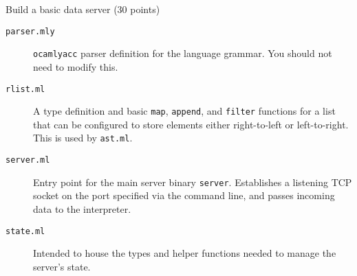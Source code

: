 \documentclass[11pt]{article}
\begin{document}
\begin{problem}{Build a basic data server (30 points)}
\begin{description}
\item[\texttt{parser.mly}] \texttt{ocamlyacc} parser definition for the language grammar. You should not need to modify this.

\item[\texttt{rlist.ml}] A type definition and basic \texttt{map}, \texttt{append}, and \texttt{filter} functions for a list that can be configured to store elements either right-to-left or left-to-right. This is used by \texttt{ast.ml}.

\item[\texttt{server.ml}] Entry point for the main server binary \texttt{server}. Establishes a listening TCP socket on the port specified via the command line, and passes incoming data to the interpreter.

\item[\texttt{state.ml}] Intended to house the types and helper functions needed to manage the server's state.
\end{description}

\end{problem}
\end{document}

